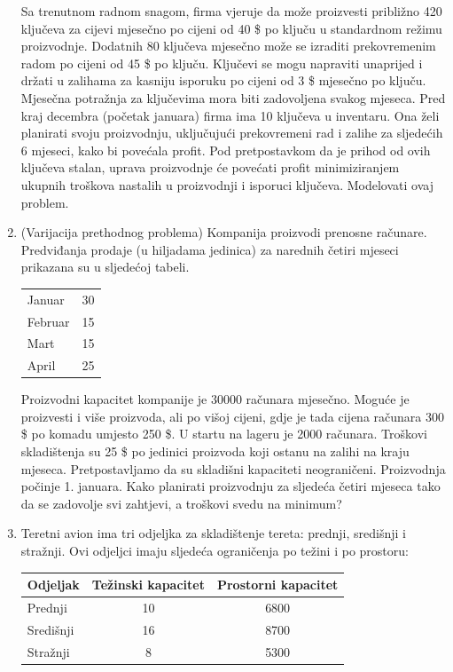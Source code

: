 \documentclass[a4paper, utf8, 11pt, colorlinks]{book}
\begin{document}
\begin{enumerate}
	Sa trenutnom radnom snagom, firma vjeruje da može proizvesti približno 420 ključeva za cijevi mjesečno po cijeni od 40 \$ po ključu u standardnom režimu proizvodnje. Dodatnih 80 ključeva mjesečno može se izraditi prekovremenim radom po cijeni od 45 \$ po ključu.
	Ključevi se mogu napraviti unaprijed i držati u zalihama za kasniju isporuku po cijeni od 3 \$ mjesečno po ključu. Mjesečna potražnja za ključevima mora biti zadovoljena svakog mjeseca. Pred kraj decembra (početak januara) firma ima 10 ključeva u inventaru. Ona 
	želi planirati svoju proizvodnju, uključujući prekovremeni rad i zalihe za sljedećih 6 mjeseci, kako bi povećala profit. Pod pretpostavkom da je prihod od ovih ključeva stalan, uprava proizvodnje  će povećati  profit minimiziranjem ukupnih troškova nastalih u proizvodnji i isporuci ključeva. Modelovati ovaj problem.
	\item %
	(Varijacija prethodnog problema) Kompanija proizvodi prenosne računare. Predviđanja prodaje (u hiljadama jedinica) za narednih četiri mjeseci prikazana su u sljedećoj tabeli. 
\begin{center}
	\begin{tabular}{lc}\hline
		Januar  & 30 \\
		Februar & 15 \\
		Mart    & 15 \\
		April   & 25 \\
		\hline
	\end{tabular}  
\end{center}	
	
	Proizvodni kapacitet kompanije je 30000 računara mjesečno. Moguće je proizvesti i više proizvoda, ali po višoj cijeni, gdje je tada cijena računara 300 \$ po komadu umjesto 250 \$. U startu na lageru je 2000 računara. Troškovi skladištenja su 25 \$ po jedinici proizvoda koji ostanu na zalihi na kraju mjeseca. Pretpostavljamo da su skladišni kapaciteti neograničeni. Proizvodnja počinje 1. januara. Kako planirati proizvodnju za sljedeća četiri mjeseca tako da se zadovolje svi zahtjevi, a troškovi svedu na minimum?
	\item Teretni avion ima tri odjeljka za skladištenje tereta: prednji, središnji i stražnji. Ovi odjeljci imaju sljedeća ograničenja po težini i po prostoru: 
\begin{table}[!ht]
	\centering
	\begin{tabular}{lcc}
	   Odjeljak   & Težinski kapacitet & Prostorni kapacitet \\ \hline
	   Prednji    & 10                 & 6800                 \\ 
	   Središnji  & 16                 & 8700                 \\
	   Stražnji   &  8                 & 5300                 \\ \hline
 	\end{tabular}
\end{table}
	

\end{enumerate}
\end{document}
